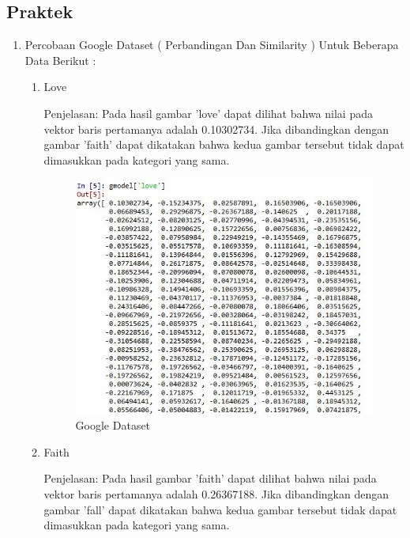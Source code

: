 \subsection{Praktek}
\begin{enumerate}
\item Percobaan Google Dataset ( Perbandingan Dan Similarity ) Untuk Beberapa Data Berikut :
\begin{enumerate}
\item Love

Penjelasan: Pada hasil gambar 'love' dapat dilihat bahwa nilai pada vektor baris pertamanya adalah 0.10302734. Jika dibandingkan dengan gambar 'faith' dapat dikatakan bahwa kedua gambar tersebut tidak dapat dimasukkan pada kategori yang sama.

\begin{figure}[!hbtp]
\centering
\includegraphics[scale=0.7]{figures/1174031/5/12love.jpg}
\caption{Google Dataset}
\label{Google Dataset}
\end{figure}

\item Faith

Penjelasan: Pada hasil gambar 'faith' dapat dilihat bahwa nilai pada vektor baris pertamanya adalah 0.26367188. Jika dibandingkan dengan gambar 'fall' dapat dikatakan bahwa kedua gambar tersebut tidak dapat dimasukkan pada kategori yang sama.


\end{enumerate}
\end{enumerate}
